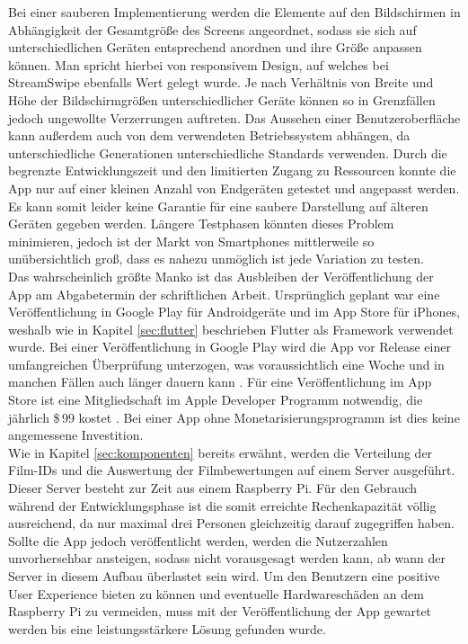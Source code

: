 \noindent
Bei einer sauberen Implementierung werden die Elemente auf den Bildschirmen in Abhängigkeit der Gesamtgröße des Screens angeordnet, sodass sie sich auf unterschiedlichen Geräten entsprechend anordnen und ihre Größe anpassen können. Man spricht hierbei von responsivem Design, auf welches bei StreamSwipe ebenfalls Wert gelegt wurde. Je nach Verhältnis von Breite und Höhe der Bildschirmgrößen unterschiedlicher Geräte können so in Grenzfällen jedoch ungewollte Verzerrungen auftreten. Das Aussehen einer Benutzeroberfläche kann außerdem auch von dem verwendeten Betriebssystem abhängen, da unterschiedliche Generationen unterschiedliche Standards verwenden. Durch die begrenzte Entwicklungszeit  und den limitierten Zugang zu Ressourcen konnte die App nur auf einer kleinen Anzahl von  Endgeräten getestet und angepasst werden. Es kann somit leider keine Garantie für eine saubere Darstellung auf älteren Geräten gegeben werden. Längere Testphasen könnten dieses Problem minimieren, jedoch ist der Markt von Smartphones mittlerweile so unübersichtlich groß, dass es nahezu unmöglich ist jede Variation zu testen.\\
Das wahrscheinlich größte Manko ist das Ausbleiben der Veröffentlichung der App am Abgabetermin der schriftlichen Arbeit. Ursprünglich geplant war eine Veröffentlichung in Google Play für Androidgeräte und im App Store für iPhones, weshalb wie in Kapitel \ref{sec:flutter} beschrieben Flutter als Framework verwendet wurde. Bei einer Veröffentlichung in Google Play wird die App vor Release einer umfangreichen Überprüfung unterzogen, was voraussichtlich eine Woche und in manchen Fällen auch länger dauern kann \cite{playstore_release}. Für eine  Veröffentlichung im App Store ist eine Mitgliedschaft im Apple Developer Programm notwendig, die jährlich \$\,99 kostet \cite{appstore_release}. Bei einer App ohne Monetarisierungsprogramm ist dies keine angemessene Investition. \\
Wie in Kapitel \ref{sec:komponenten} bereits erwähnt, werden die Verteilung der Film-IDs und die Auswertung der Filmbewertungen auf einem Server ausgeführt. Dieser Server besteht zur Zeit aus einem Raspberry Pi. Für den Gebrauch während der Entwicklungsphase ist die somit erreichte Rechenkapazität völlig ausreichend, da nur maximal drei Personen gleichzeitig darauf zugegriffen haben. Sollte die App jedoch veröffentlicht werden, werden die Nutzerzahlen unvorhersehbar ansteigen, sodass nicht vorausgesagt werden kann, ab wann der Server in diesem Aufbau überlastet sein wird. Um den Benutzern eine positive User Experience bieten zu können und eventuelle Hardwareschäden an dem Raspberry Pi zu vermeiden, muss mit der Veröffentlichung der App gewartet werden bis eine leistungsstärkere Lösung gefunden wurde.